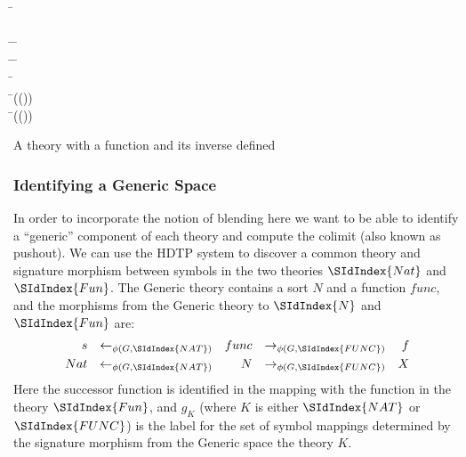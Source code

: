 \begin{listing}[!ht]
\begin{mdframed}
\begin{hetcasl}
\SPEC \= \Ax{=}\\
\> \SORT {}\\
\> \OP \= \Ax{:} \= \Ax{\rightarrow} \\
\> \OP \= \Ax{:} \= \Ax{\rightarrow} \\
\> \Ax{\forall} \= \Ax{:}  \\
\> \Ax{\bullet} \=(()) \Ax{=} \\
\> \Ax{\bullet} \=(()) \Ax{=} \\
\end{hetcasl}
\end{mdframed}
\caption{A theory with a function and its inverse defined}
\label{fig:inv}
\end{listing}



\subsubsection{Identifying a Generic Space}
In order to incorporate the notion of blending here we want to be able
to identify a ``generic'' component of each theory and compute the
colimit (also known as pushout).
We can use the
HDTP system \parencite{GustKS2006,Schmidt2010} to discover a common theory
and signature morphism between symbols in the
two theories $\SIdIndex{Nat}$ and $\SIdIndex{Fun}$. The Generic theory
contains a sort $N$ and a function $func$, and the morphisms from the
Generic theory to $\SIdIndex{N}$ and $\SIdIndex{Fun}$ are:
\begin{align}
s&&\leftarrow_{\phi(G,\SIdIndex{NAT})}&&func&&\rightarrow_{\phi(G,\SIdIndex{FUNC})}&&f\\
Nat&&\leftarrow_{\phi(G,\SIdIndex{NAT})}&&N&&\rightarrow_{\phi(G,\SIdIndex{FUNC})}&&X
\end{align}
Here the successor function is identified in the mapping with the
function in the theory $\SIdIndex{Fun}$, and $g_K$ (where $K$ is either
$\SIdIndex{NAT}$ or $\SIdIndex{FUNC}$) is the label for
the set of symbol mappings determined by the signature morphism from
the Generic space the theory $K$.

